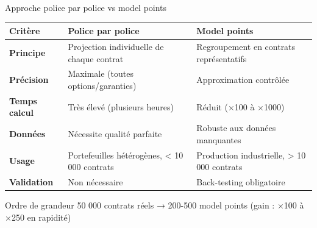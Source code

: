 \documentclass[10pt,aspectratio=169]{beamer}
\begin{document}
\begin{frame}{Approche police par police vs model points}
\begin{table}
\centering
\small
\begin{tabular}{l|p{5.5cm}|p{5.5cm}}
\toprule
\textbf{Critère} & \textbf{Police par police} & \textbf{Model points} \\
\midrule
\rowcolor{bleuactu!10}
\textbf{Principe} & Projection individuelle de chaque contrat & Regroupement en contrats représentatifs \\
\textbf{Précision} & Maximale (toutes options/garanties) & Approximation contrôlée \\
\rowcolor{bleuactu!10}
\textbf{Temps calcul} & Très élevé (plusieurs heures) & Réduit (×100 à ×1000) \\
\textbf{Données} & Nécessite qualité parfaite & Robuste aux données manquantes \\
\rowcolor{bleuactu!10}
\textbf{Usage} & Portefeuilles hétérogènes, < 10 000 contrats & Production industrielle, > 10 000 contrats \\
\textbf{Validation} & Non nécessaire & Back-testing obligatoire \\
\bottomrule
\end{tabular}
\end{table}

\vspace{0.3cm}
\begin{exampleblock}{Ordre de grandeur}
50 000 contrats réels → 200-500 model points (gain : ×100 à ×250 en rapidité)
\end{exampleblock}
\end{frame}
\end{document}
